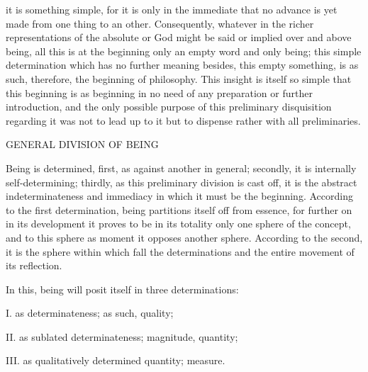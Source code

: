 it is something simple, for it is only in the immediate that no advance is
yet made from one thing to an other. Consequently, whatever in the richer
representations of the absolute or God might be said or implied over and
above being, all this is at the beginning only an empty word and only
being; this simple determination which has no further meaning besides,
this empty something, is as such, therefore, the beginning of philosophy.
This insight is itself so simple that this beginning is as beginning in
no need of any preparation or further introduction, and the only possible
purpose of this preliminary disquisition regarding it was not to lead up to
it but to dispense rather with all preliminaries.

GENERAL DIVISION OF BEING

Being is determined, first, as against another in general;
secondly, it is internally self-determining;
thirdly, as this preliminary division is cast off,
it is the abstract indeterminateness and immediacy
in which it must be the beginning.
According to the first determination,
being partitions itself off from essence,
for further on in its development it proves to be
in its totality only one sphere of the concept, and
to this sphere as moment it opposes another sphere.
According to the second, it is the sphere within which
fall the determinations and the entire movement of its reflection.

In this, being will posit itself in three determinations:

I. as determinateness; as such, quality;

II. as sublated determinateness; magnitude, quantity;

III. as qualitatively determined quantity; measure.

